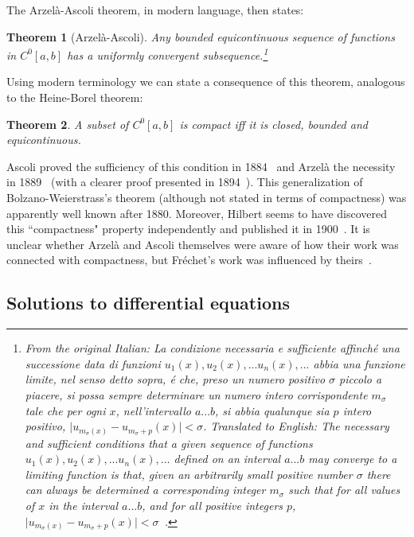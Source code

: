 \documentclass[12pt]{article}
\newtheorem{thm}{Theorem}[section]
\begin{document}
The Arzel\`{a}-Ascoli theorem, in modern language, then states: 

\begin{thm} [Arzel\`{a}-Ascoli]
 Any bounded equicontinuous sequence of functions in
$C^0[a,b]$ has a uniformly convergent subsequence.\footnote{From the original Italian: La condizione necessaria e sufficiente affinch\'{e} una successione data di funzioni $u_1(x), u_2(x), ... u_n(x),...$ abbia una funzione limite, nel senso detto sopra, \'{e} che, preso un numero positivo $\sigma$ piccolo a piacere, si possa sempre determinare un numero intero corrispondente $m_\sigma$ tale che per ogni $x$, nell'intervallo $a ... b$, si abbia qualunque sia $p$ intero positivo, $\mid u_{m_\sigma(x)} - u_{m_\sigma+p} (x) \mid < \sigma$. Translated to English: The necessary and sufficient conditions that a given sequence of functions $u_1(x), u_2(x), ... u_n(x),...$ defined on an interval $a ... b$ may converge to a limiting function is that, given an arbitrarily small positive number $\sigma$ there can always be determined a corresponding integer $m_\sigma$ such that for all values of $x$ in the interval $a ...b$, and for all positive integers $p$, $\mid u_{m_\sigma(x)} - u_{m_\sigma+p} (x) \mid < \sigma$~\cite[p. 226]{asc2}.}
\end{thm}

Using modern terminology we can state a consequence of this theorem, analogous to the Heine-Borel theorem:

\begin{thm}
A subset of $C^0[a,b]$ is compact iff it is closed, bounded and equicontinuous.
\end{thm}

Ascoli proved the sufficiency of this condition in 1884~\cite[p.567]{asc1} and Arzel\`{a} the necessity in 1889~\cite[p. 345]{arze} (with a clearer proof presented in 1894~\cite[p. 226]{asc2}). This generalization of Bolzano-Weierstrass's theorem (although not stated in terms of compactness) was apparently well known after 1880. Moreover, Hilbert seems to have discovered this
``compactness" property independently and published it in 1900~\cite[p. 82]{die1}. It is 
unclear whether Arzel\`{a} and Ascoli themselves were aware of how their work
was connected with compactness, but Fr\'{e}chet's work was influenced by theirs~\cite[p. 255]{tay1}. 





\subsection{Solutions to differential equations}
\end{document}
